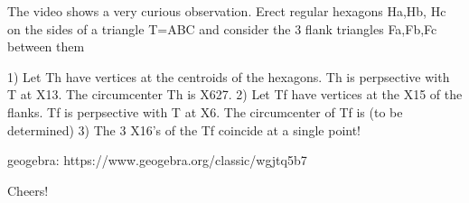 The video shows a very curious observation. Erect regular hexagons Ha,Hb, Hc on the sides of a triangle T=ABC and consider the 3 flank triangles Fa,Fb,Fc between them 

1) Let Th have vertices at the centroids of the hexagons. Th is perpsective with T at X13. The circumcenter Th is X627.
2) Let Tf have vertices at the X15 of the flanks. Tf is perpsective with T at X6. The circumcenter of Tf is (to be determined)
3) The 3 X16's of the Tf coincide at a single point!

geogebra: https://www.geogebra.org/classic/wgjtq5b7

Cheers!